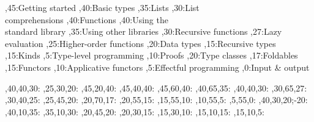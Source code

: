 
\setcounter{diagheight}{50}
\begin{chart}
	,45:{Getting started}
	,40:{Basic types}
	,35:{Lists}
	,30:{List\\comprehensions}
	,40:{Functions}
	,40:{Using the\\standard library}
	,35:{Using other libraries}
	,30:{Recursive functions}
	,27:{Lazy evaluation}
	,25:{Higher-order functions}
	,20:{Data types}
	,15:{Recursive types}
	,15:{Kinds}
	,5:{Type-level programming}
	,10:{Proofs}
	,20:{Type classes}
	,17:{Foldables}
	,15:{Functors}
	,10:{Applicative functors}
	,5:{Effectful programming}
	,0:{Input \& output}
	
	,40,40,30:
	,25,30,20:
	,45,20,40:
	,45,40,40:
	,45,60,40:
	,40,65,35:
	,40,40,30:
	,30,65,27:
	,30,40,25:
	,25,45,20:
	,20,70,17:
	,20,55,15:
	,15,55,10:
	,10,55,5:
	,5,55,0:
	,40,30,20;-20:
	,40,10,35:
	,35,10,30:
	,20,45,20:
	,20,30,15:
	,15,30,10:
	,15,10,15:
	,15,10,5:
\end{chart}

